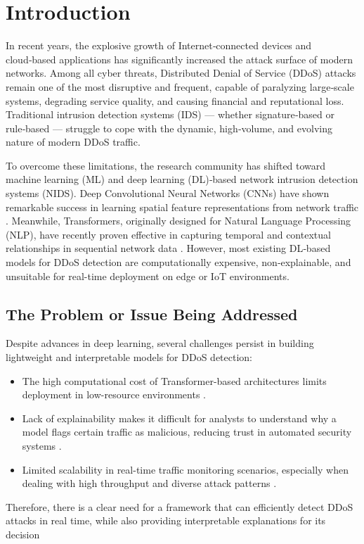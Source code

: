 \documentclass[12pt, a4paper]{report}
\begin{document}
\clearpage

\chapter{Introduction}
In recent years, the explosive growth of Internet‑connected devices and cloud‑based applications has significantly increased the attack surface of modern networks. Among all cyber threats, Distributed Denial of Service (DDoS) attacks remain one of the most disruptive and frequent, capable of paralyzing large‑scale systems, degrading service quality, and causing financial and reputational loss. Traditional intrusion detection systems (IDS) — whether signature‑based or rule‑based — struggle to cope with the dynamic, high‑volume, and evolving nature of modern DDoS traffic.

To overcome these limitations, the research community has shifted toward machine learning (ML) and deep learning (DL)‑based network intrusion detection systems (NIDS). Deep Convolutional Neural Networks (CNNs) have shown remarkable success in learning spatial feature representations from network traffic \cite{1mohammadpour2022cnn_ids}. Meanwhile, Transformers, originally designed for Natural Language Processing (NLP), have recently proven effective in capturing temporal and contextual relationships in sequential network data \cite{2farias2025transformers_ddos}. However, most existing DL‑based models for DDoS detection are computationally expensive, non‑explainable, and unsuitable for real-time deployment on edge or IoT environments.



\pagestyle{plain} %

\section{The Problem or Issue Being Addressed}


Despite advances in deep learning, several challenges persist in building lightweight and interpretable models for DDoS detection:
\begin{itemize}
  

 \item The high computational cost of Transformer-based architectures limits deployment in low-resource environments \cite{3wang2024ddos_msct}.

 \item Lack of explainability makes it difficult for analysts to understand why a model flags certain traffic as malicious, reducing trust in automated security systems \cite{4zhang2025intrusion_cnn_bilstm_transformer}.

 \item Limited scalability in real-time traffic monitoring scenarios, especially when dealing with high throughput and diverse attack patterns \cite{5liu2025cnn_lstm_transformer_ids}.
\end{itemize}
Therefore, there is a clear need for a framework that can efficiently detect DDoS attacks in real time, while also providing interpretable explanations for its decision
\end{document}
